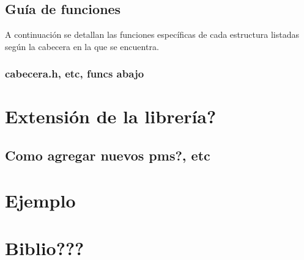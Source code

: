 \documentclass[12pt,a4paper,final]{article}
\begin{document}
	\subsection{Guía de funciones}
		A continuación se detallan las funciones específicas de cada estructura
		listadas según la cabecera en la que se encuentra.
		
		\subsubsection{cabecera.h, etc, funcs abajo}

\section{Extensión de la librería?}
	\subsection{Como agregar nuevos pms?, etc}

\section{Ejemplo}

\section{Biblio???}

\printindex
\end{document}
